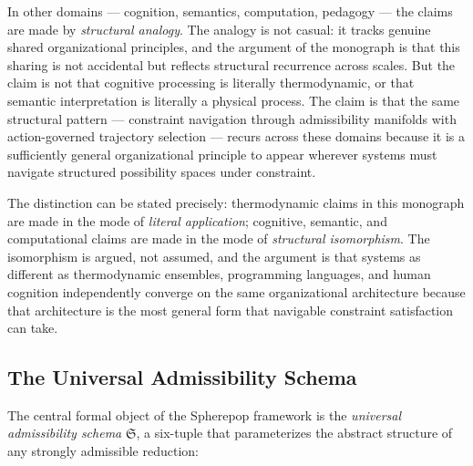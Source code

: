 \documentclass[12pt,openany]{book}
\theoremstyle{plain}
\theoremstyle{definition}
\theoremstyle{remark}
\begin{document}
In other domains — cognition, semantics, computation, pedagogy — the claims are made by \emph{structural analogy}. The analogy is not casual: it tracks genuine shared organizational principles, and the argument of the monograph is that this sharing is not accidental but reflects structural recurrence across scales. But the claim is not that cognitive processing is literally thermodynamic, or that semantic interpretation is literally a physical process. The claim is that the same structural pattern — constraint navigation through admissibility manifolds with action-governed trajectory selection — recurs across these domains because it is a sufficiently general organizational principle to appear wherever systems must navigate structured possibility spaces under constraint.

The distinction can be stated precisely: thermodynamic claims in this monograph are made in the mode of \emph{literal application}; cognitive, semantic, and computational claims are made in the mode of \emph{structural isomorphism}. The isomorphism is argued, not assumed, and the argument is that systems as different as thermodynamic ensembles, programming languages, and human cognition independently converge on the same organizational architecture because that architecture is the most general form that navigable constraint satisfaction can take.

\subsection*{The Universal Admissibility Schema}

The central formal object of the Spherepop framework is the \emph{universal admissibility schema} $\mathfrak{S}$, a six-tuple that parameterizes the abstract structure of any strongly admissible reduction:
\end{document}
